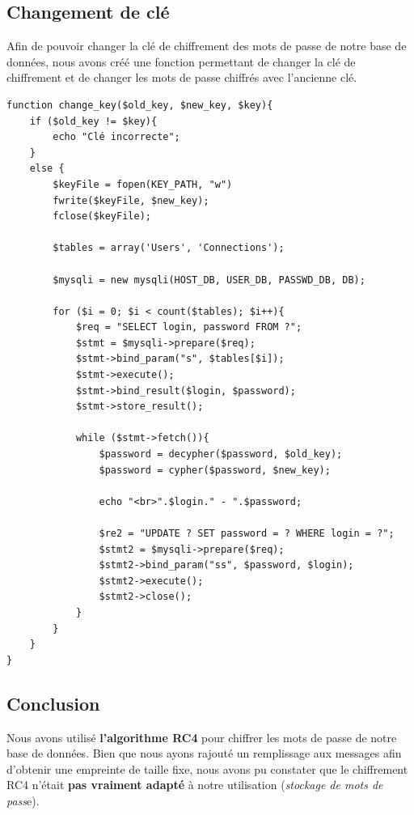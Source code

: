 \documentclass[12pt, a4paper]{article}
\begin{document}
\subsection{Changement de clé}

Afin de pouvoir changer la clé de chiffrement des mots de passe de notre base de données,
nous avons créé une fonction permettant de changer la clé de chiffrement
et de changer les mots de passe chiffrés avec l'ancienne clé.

\begin{lstlisting}[name=Fonction de changement de clé]
function change_key($old_key, $new_key, $key){
    if ($old_key != $key){
        echo "Clé incorrecte";
    }
    else {
        $keyFile = fopen(KEY_PATH, "w")
        fwrite($keyFile, $new_key);
        fclose($keyFile);

        $tables = array('Users', 'Connections');
        
        $mysqli = new mysqli(HOST_DB, USER_DB, PASSWD_DB, DB);

        for ($i = 0; $i < count($tables); $i++){
            $req = "SELECT login, password FROM ?";
            $stmt = $mysqli->prepare($req);
            $stmt->bind_param("s", $tables[$i]);
            $stmt->execute();
            $stmt->bind_result($login, $password);
            $stmt->store_result();

            while ($stmt->fetch()){
                $password = decypher($password, $old_key);
                $password = cypher($password, $new_key);

                echo "<br>".$login." - ".$password;

                $re2 = "UPDATE ? SET password = ? WHERE login = ?";
                $stmt2 = $mysqli->prepare($req);
                $stmt2->bind_param("ss", $password, $login);
                $stmt2->execute();
                $stmt2->close();
            }
        }
    }
}
\end{lstlisting}

\subsection*{Conclusion}

Nous avons utilisé \textbf{l'algorithme RC4} pour chiffrer les mots de passe de notre base de données.
Bien que nous ayons rajouté un remplissage aux messages afin d'obtenir une empreinte de taille fixe,
nous avons pu constater que le chiffrement RC4 n'était \textbf{pas vraiment adapté} à notre utilisation (\textit{stockage de mots de pass}e).
\end{document}
